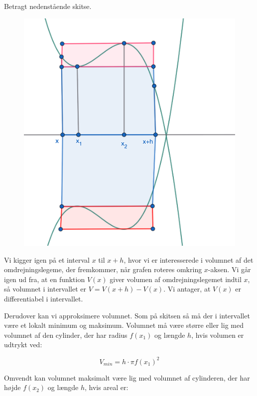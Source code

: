 \documentclass{article}
\makeatletter
\newenvironment{proofw}{\par
  \pushQED{\qed}%
  \normalfont \topsep6\p@\@plus6\p@\relax
  \trivlist
  \item[]\ignorespaces
}{%
  \popQED\endtrivlist\@endpefalse
}
\makeatother
\begin{document}
\begin{proofw}
    
Betragt nedenstående skitse.

\begin{figure}[h]
    \centering
    \includegraphics[scale=0.4]{skitser/omdrejningslegeme.png}
\end{figure}

Vi kigger igen på et interval $x$ til $x+h$,
hvor vi er interesserede i volumnet af det omdrejningslegeme,
der fremkommer, når grafen roteres omkring $x$-aksen.
Vi går igen ud fra, at en funktion $V(x)$ giver volumen af omdrejningslegemet
indtil $x$, så volumnet i intervallet er $V=V(x+h)-V(x)$.
Vi antager, at $V(x)$ er differentiabel i intervallet.

Derudover kan vi approksimere volumnet. Som på skitsen
så må der i intervallet være et lokalt minimum og maksimum.
Volumnet må være større eller lig med volumnet af den cylinder,
der har radius $f(x_1)$ og længde $h$, hvis volumen er udtrykt ved:

$$
    V_{min}=h \cdot \pi f(x_1)^2
$$

Omvendt kan volumnet maksimalt være lig med volumnet af cylinderen,
der har højde $f(x_2)$ og længde $h$, hvis areal er:


\end{proofw}
\end{document}
